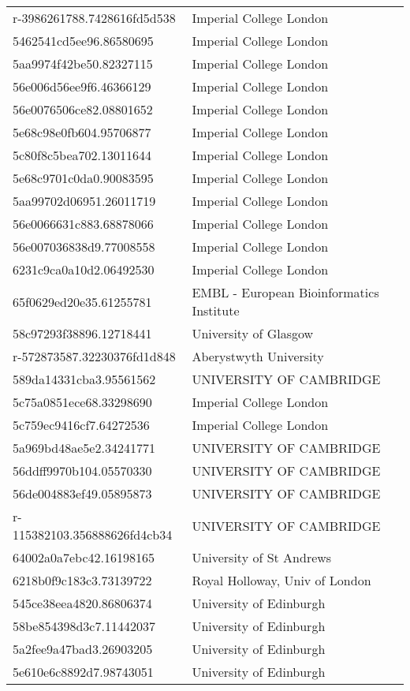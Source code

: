 \begin{tabular}{ll}
r-3986261788.7428616fd5d538 & Imperial College London \\
5462541cd5ee96.86580695 & Imperial College London \\
5aa9974f42be50.82327115 & Imperial College London \\
56e006d56ee9f6.46366129 & Imperial College London \\
56e0076506ce82.08801652 & Imperial College London \\
5e68c98e0fb604.95706877 & Imperial College London \\
5c80f8c5bea702.13011644 & Imperial College London \\
5e68c9701c0da0.90083595 & Imperial College London \\
5aa99702d06951.26011719 & Imperial College London \\
56e0066631c883.68878066 & Imperial College London \\
56e007036838d9.77008558 & Imperial College London \\
6231c9ca0a10d2.06492530 & Imperial College London \\
65f0629ed20e35.61255781 & EMBL - European Bioinformatics Institute \\
58c97293f38896.12718441 & University of Glasgow \\
r-572873587.32230376fd1d848 & Aberystwyth University \\
589da14331cba3.95561562 & UNIVERSITY OF CAMBRIDGE \\
5c75a0851ece68.33298690 & Imperial College London \\
5c759ec9416cf7.64272536 & Imperial College London \\
5a969bd48ae5e2.34241771 & UNIVERSITY OF CAMBRIDGE \\
56ddff9970b104.05570330 & UNIVERSITY OF CAMBRIDGE \\
56de004883ef49.05895873 & UNIVERSITY OF CAMBRIDGE \\
r-115382103.356888626fd4cb34 & UNIVERSITY OF CAMBRIDGE \\
64002a0a7ebc42.16198165 & University of St Andrews \\
6218b0f9c183c3.73139722 & Royal Holloway, Univ of London \\
545ce38eea4820.86806374 & University of Edinburgh \\
58be854398d3c7.11442037 & University of Edinburgh \\
5a2fee9a47bad3.26903205 & University of Edinburgh \\
5e610e6c8892d7.98743051 & University of Edinburgh \\

\end{tabular}
